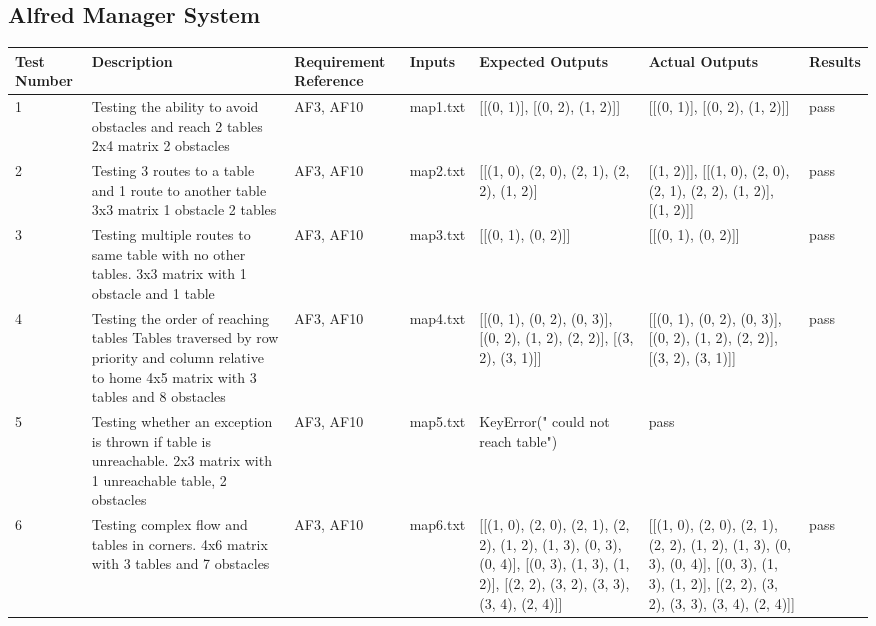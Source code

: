\documentclass [10pt]{article}
\begin{document}
\subsection {Alfred Manager System}

\begin{longtable}{| p{} | p{} | p{} | p{} | p{} | p{} | p{} |}\hline 
	\rowcolor{tableCell}\textbf{Test Number} & \textbf{Description} & \textbf{Requirement Reference} & \textbf{Inputs} & \textbf{Expected Outputs} & \textbf{Actual Outputs}& \textbf{Results} \\ \hline
	1 &  Testing the ability to avoid obstacles and reach 2 tables 2x4 matrix 2 obstacles &  AF3, AF10 &  map1.txt &  [[(0, 1)], [(0, 2), (1, 2)]] &  [[(0, 1)], [(0, 2), (1, 2)]] &  pass
	\\ \hline  
	2 &  Testing 3 routes to a table and 1 route to another table 3x3 matrix 1 obstacle 2 tables &  AF3, AF10 &  map2.txt & [[(1, 0), (2, 0), (2, 1), (2, 2), (1, 2)] &  [(1, 2)]], [[(1, 0), (2, 0), (2, 1), (2, 2), (1, 2)], [(1, 2)]] &  pass
	\\ \hline  
	3 &  Testing multiple routes to same table with no other tables. 3x3 matrix with 1 obstacle and 1 table &  AF3, AF10 &  map3.txt & [[(0, 1), (0, 2)]] &  [[(0, 1), (0, 2)]] &  pass
	\\ \hline  
	4 &  Testing the order of reaching tables Tables traversed by row priority and column relative to home 4x5 matrix with 3 tables and 8 obstacles &  AF3, AF10 &  map4.txt & [[(0, 1), (0, 2), (0, 3)], [(0, 2), (1, 2), (2, 2)], [(3, 2), (3, 1)]] &  [[(0, 1), (0, 2), (0, 3)], [(0, 2), (1, 2), (2, 2)], [(3, 2), (3, 1)]] &  pass
	\\ \hline  
	5 &  Testing whether an exception is thrown if table is unreachable. 2x3 matrix with 1 unreachable table, 2 obstacles &  AF3, AF10 &  map5.txt &  KeyError(" could not reach table") &  pass
	\\ \hline  
	6 &  Testing complex flow and tables in corners. 4x6 matrix with 3 tables and 7 obstacles &  AF3, AF10 &  map6.txt & [[(1, 0), (2, 0), (2, 1), (2, 2), (1, 2), (1, 3), (0, 3), (0, 4)], [(0, 3), (1, 3), (1, 2)], [(2, 2), (3, 2), (3, 3), (3, 4), (2, 4)]] &  [[(1, 0), (2, 0), (2, 1), (2, 2), (1, 2), (1, 3), (0, 3), (0, 4)], [(0, 3), (1, 3), (1, 2)], [(2, 2), (3, 2), (3, 3), (3, 4), (2, 4)]] &  pass
	\\ \hline  

\end{longtable}
\end{document}
